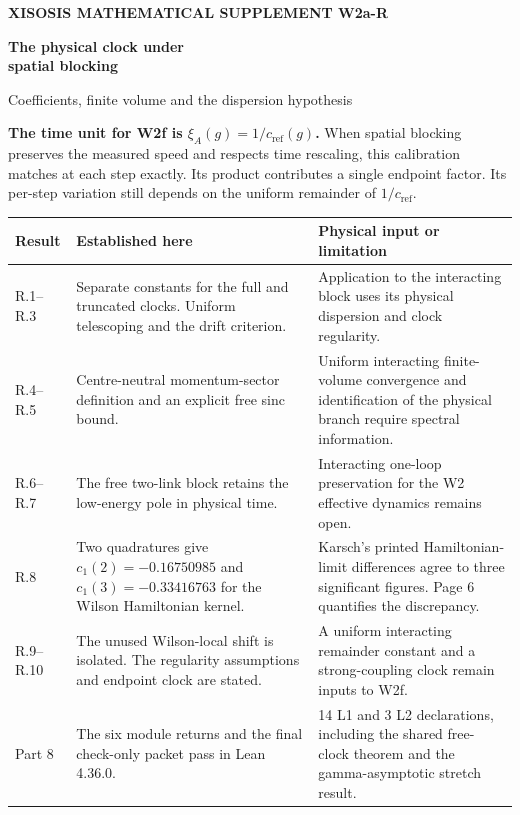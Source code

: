\documentclass[11pt,a4paper]{article}
\newcommand{\lab}[1]{{\sffamily\bfseries\color{teal}#1}}
\newcommand{\cR}{c_{\mathrm{ref}}}
\begin{document}
\raggedright
{\sffamily\small\bfseries\color{teal}XISOSIS \quad MATHEMATICAL SUPPLEMENT \quad W2a-R}\par
\vspace{4pt}
{\sffamily\bfseries\color{ink}\fontsize{30}{34}\selectfont The physical clock under\\spatial blocking\par}
{\sffamily\color{muted}\large Coefficients, finite volume and the dispersion hypothesis}\par
\vspace{3pt}
\textbf{The time unit for W2f is $\xi_A(g)=1/\cR(g)$.} When spatial blocking preserves the measured speed and respects time rescaling, this calibration matches at each step exactly. Its product contributes a single endpoint factor. Its per-step variation still depends on the uniform remainder of $1/\cR$.

\begin{tabularx}{\linewidth}{@{}p{.17\linewidth}YY@{}}
\toprule
\lab{Result} & \lab{Established here} & \lab{Physical input or limitation}\\\midrule
R.1--R.3 & Separate constants for the full and truncated clocks. Uniform telescoping and the drift criterion. & Application to the interacting block uses its physical dispersion and clock regularity.\\
R.4--R.5 & Centre-neutral momentum-sector definition and an explicit free sinc bound. & Uniform interacting finite-volume convergence and identification of the physical branch require spectral information.\\
R.6--R.7 & The free two-link block retains the low-energy pole in physical time. & Interacting one-loop preservation for the W2 effective dynamics remains open.\\
R.8 & Two quadratures give $c_1(2)=-0.16750985$ and $c_1(3)=-0.33416763$ for the Wilson Hamiltonian kernel. & Karsch's printed Hamiltonian-limit differences agree to three significant figures. Page 6 quantifies the discrepancy.\\
R.9--R.10 & The unused Wilson-local shift is isolated. The regularity assumptions and endpoint clock are stated. & A uniform interacting remainder constant and a strong-coupling clock remain inputs to W2f.\\
Part 8 & The six module returns and the final check-only packet pass in Lean 4.36.0. & 14 L1 and 3 L2 declarations, including the shared free-clock theorem and the gamma-asymptotic stretch result.\\
\bottomrule
\end{tabularx}
\end{document}
